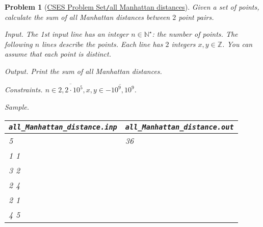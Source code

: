 \documentclass{article}
\newtheorem{problem}{Problem}
\begin{document}
\begin{problem}[\href{https://cses.fi/problemset/task/3411}{CSES Problem Set{\tt/}all Manhattan distances}]
    Given a set of points, calculate the sum of all Manhattan distances between $2$ point pairs.
    \item {\sf Input.} The 1st input line has an integer $n\in\mathbb{N}^\star$: the number of points. The following $n$ lines describe the points. Each line has $2$ integers $x,y\in\mathbb{Z}$. You can assume that each point is distinct.
    \item {\sf Output.} Print the sum of all Manhattan distances.
    \item {\sf Constraints.} $n\in\overline{2,2\cdot10^5},x,y\in\overline{-10^9,10^9}$.
    \item {\sf Sample.}
    \begin{table}[H]
        \centering
        \begin{tabular}{|l|l|}
            \hline
            \verb|all_Manhattan_distance.inp| & \verb|all_Manhattan_distance.out| \\
            \hline
            5 & 36 \\
            1 1 & \\
            3 2 & \\
            2 4 & \\
            2 1 & \\
            4 5 & \\
            \hline
        \end{tabular}
    \end{table}
\end{problem}
\end{document}
